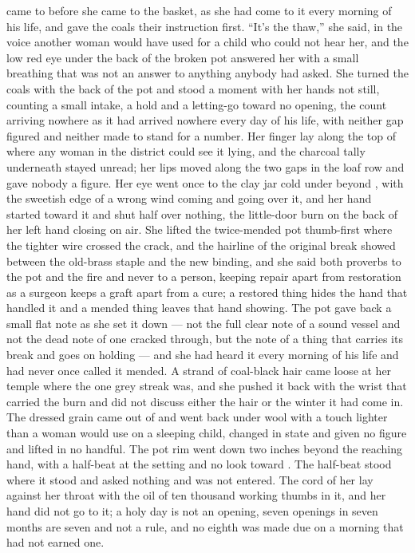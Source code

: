  came to  before she came to the basket, as she had come to it every morning of his life, and gave the coals their instruction first. “It's the thaw,” she said, in the voice another woman would have used for a child who could not hear her, and the low red eye under the back of the broken pot answered her with a small breathing that was not an answer to anything anybody had asked. She turned the coals with the back of the pot and stood a moment with her hands not still, counting a small intake, a hold and a letting-go toward no opening, the count arriving nowhere as it had arrived nowhere every day of his life, with neither gap figured and neither made to stand for a number. Her finger lay along the top of  where any woman in the district could see it lying, and the charcoal tally underneath stayed unread; her lips moved along the two gaps in the loaf row and gave nobody a figure. Her eye went once to the clay jar cold under  beyond , with the sweetish edge of a wrong wind coming and going over it, and her hand started toward it and shut half over nothing, the little-door burn on the back of her left hand closing on air. She lifted the twice-mended pot thumb-first where the tighter wire crossed the crack, and the hairline of the original break showed between the old-brass staple and the new binding, and she said both proverbs to the pot and the fire and never to a person, keeping repair apart from restoration as a surgeon keeps a graft apart from a cure; a restored thing hides the hand that handled it and a mended thing leaves that hand showing. The pot gave back a small flat note as she set it down --- not the full clear note of a sound vessel and not the dead note of one cracked through, but the note of a thing that carries its break and goes on holding --- and she had heard it every morning of his life and had never once called it mended. A strand of coal-black hair came loose at her temple where the one grey streak was, and she pushed it back with the wrist that carried the burn and did not discuss either the hair or the winter it had come in. The dressed grain came out of  and went back under wool with a touch lighter than a woman would use on a sleeping child, changed in state and given no figure and lifted in no handful. The pot rim went down two inches beyond the reaching hand, with a half-beat at the setting and no look toward . The half-beat stood where it stood and asked nothing and was not entered. The cord of her  lay against her throat with the oil of ten thousand working thumbs in it, and her hand did not go to it; a holy day is not an opening, seven openings in seven months are seven and not a rule, and no eighth was made due on a morning that had not earned one.

